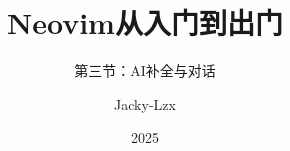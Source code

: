 \documentclass[17pt]{ctexbeamer}
\title{Neovim从入门到出门}
\subtitle{第三节：AI补全与对话}
\author{Jacky-Lzx}
\date{2025}
\begin{document}
\begin{frame}
  \titlepage
\end{frame}
\end{document}
